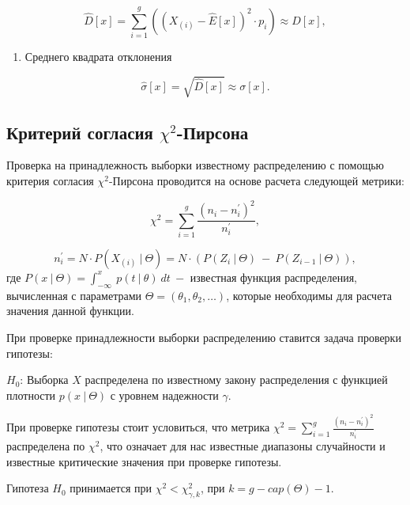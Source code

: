 \documentclass[
  14,
]{article}
\providecommand{\tightlist}{%
  \setlength{\itemsep}{0pt}\setlength{\parskip}{0pt}}
\begin{document}
\[
\hat{D}[x] = \sum_{i=1}^{g} \left( \left( X_{(i)} - \hat{E}[x] \right)^2 \cdot p_i \right) \approx D[x],
\]

\begin{enumerate}
\def\labelenumi{\arabic{enumi}.}
\setcounter{enumi}{2}
\tightlist
\item
  Среднего квадрата отклонения
\end{enumerate}

\[
\hat{\sigma}[x] = \sqrt{\hat{D}[x]} \approx \sigma[x].
\]

\hypertarget{ux43aux440ux438ux442ux435ux440ux438ux439-ux441ux43eux433ux43bux430ux441ux438ux44f-chi2-ux43fux438ux440ux441ux43eux43dux430}{%
\subsection{\texorpdfstring{\textbf{Критерий согласия}
\(\chi^2\)-Пирсона}{Критерий согласия \textbackslash chi\^{}2-Пирсона}}\label{ux43aux440ux438ux442ux435ux440ux438ux439-ux441ux43eux433ux43bux430ux441ux438ux44f-chi2-ux43fux438ux440ux441ux43eux43dux430}}

Проверка на принадлежность выборки известному распределению с помощью
критерия согласия \(\chi^2\)-Пирсона проводится на основе расчета
следующей метрики:

\[
\chi^2 = \sum_{i=1}^{g} \frac{(n_i - n_i^{'})^2}{n_i^{'}}, 
\]

\[
n_i^{'} = N \cdot P(X_{(i)} \ |\ \Theta) = N \cdot \left( P(Z_{i}\ | \ \Theta)\ -\ P(Z_{i-1}\ | \ \Theta)  \right),
\] где
\(P(x \ | \ \Theta) = \int_{-\infty}^{x}\ p(t\ |\ \theta)\ dt\ -\)
известная функция распределения, вычисленная с параметрами
\(\Theta = (\theta_1, \theta_2, \dots)\), которые необходимы для расчета
значения данной функции.

При проверке принадлежности выборки распределению ставится задача
проверки гипотезы:

\(H_0\): Выборка \(X\) распределена по известному закону распределения с
функцией плотности \(p(x\ |\ \Theta)\) с уровнем надежности \(\gamma\).

При проверке гипотезы стоит условиться, что метрика
\(\chi^2 = \sum_{i=1}^{g} \frac{(n_i - n_i^{'})^2}{n_i^{'}}\)
распределена по \(\chi^2\), что означает для нас известные диапазоны
случайности и известные критические значения при проверке гипотезы.

Гипотеза \(H_0\) принимается при \(\chi^2 < \chi_{\gamma, k}^2\), при
\(k = g - cap(\Theta) - 1\).
\end{document}
